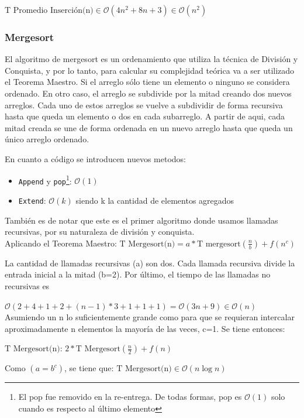 \documentclass[article,a4paper]{article}
\newcommand{\bigO}{\mathcal{O}}
\begin{document}
$\mbox{T Promedio Inserción(n)} \in \bigO(4n^2 + 8n + 3) \in \bigO(n^2)$

\subsubsection{Mergesort}

El algoritmo de mergesort es un ordenamiento que utiliza la técnica de División y Conquista, y por lo tanto, para calcular su complejidad teórica va a ser utilizado el Teorema Maestro. Si el arreglo sólo tiene un elemento o ninguno se considera ordenado. En otro caso, el arreglo se subdivide por la mitad creando dos nuevos arreglos. Cada uno de estos arreglos se vuelve a subdividir de forma recursiva hasta que queda un elemento o dos en cada subarreglo. A partir de aqui, cada mitad creada se une de forma ordenada en un nuevo arreglo hasta que queda un único arreglo ordenado.

En cuanto a código se introducen nuevos metodos:

\begin{itemize}
\item \texttt{Append} y \texttt{pop}\footnote{El pop fue removido en la re-entrega. De todas formas, pop es $\bigO(1)$ solo cuando es respecto al último elemento}: $\bigO(1)$
\item \texttt{Extend}: $\bigO(k)$ siendo k la cantidad de elementos agregados
\end{itemize}

También es de notar que este es el primer algoritmo donde usamos llamadas recursivas, por su naturaleza de división y conquista.\\

Aplicando el Teorema Maestro: $\mbox{T Mergesort(n)} = a * \mbox{T mergesort}(\frac{n}{b}) + f(n^c)$

La cantidad de llamadas recursivas (a) son dos. Cada llamada recursiva divide la entrada inicial a la mitad (b=2). Por último, el tiempo de las llamadas no recursivas es

$\bigO(2 + 4 + 1 + 2 + (n-1) * 3 + 1 + 1 + 1) = \bigO(3n + 9) \in \bigO(n)$\\

Asumiendo un n lo suficientemente grande como para que se requieran intercalar aproximadamente n elementos la mayoría de las veces, c=1. Se tiene entonces:

$\mbox{T Mergesort(n): } 2 * \mbox{T Mergesort} (\frac{n}{2}) + f(n)$

Como $(a = b^c)$, se tiene que: $\mbox{T Mergesort(n)} \in \bigO(n \log n)$\\
\end{document}
